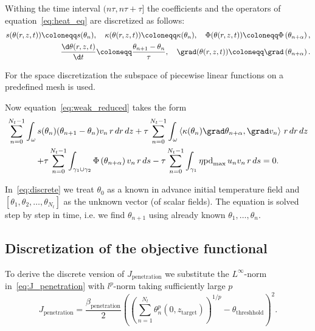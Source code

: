 Withing the time interval $(n\tau, n\tau+\tau]$ the coefficients and the operators of equation~\eqref{eq:heat_eq} are discretized as follows:
\begin{equation}
\begin{split}
	s(\theta(r,z,t)) \coloneqq s(\theta_n), \quad \kappa(\theta(r,z,t)) \coloneqq \kappa(\theta_n), \quad \Phi(\theta(r,z,t)) \coloneqq \Phi\left(\theta_{n+\alpha}\right), \\
	\frac{\d\theta(r,z,t)}{\d t} \coloneqq \frac{\theta_{n+1}-\theta_n}{\tau}, \quad
	\grad(\theta(r,z,t)) \coloneqq \grad\left(\theta_{n+\alpha}\right).
\end{split}
\end{equation}

For the space discretization the subspace of piecewise linear functions on a predefined mesh is used.

Now equation~\eqref{eq:weak_reduced} takes the form
\begin{multline} \label{eq:discrete}
	\sum_{n=0}^{N_t-1}\int_{\omega}
		s(\theta_n) (\theta_{n+1}-\theta_n) v_n\, r\, dr\, dz
	+ \tau
	\sum_{n=0}^{N_t-1}\int_{\omega}
		\left\langle \kappa(\theta_n) \grad \theta_{n+\alpha} , \grad v_n \right\rangle\, r\, dr \, dz \\
	+ \tau
	\sum_{n=0}^{N_t-1}\int_{\gamma_1 \cup \gamma_2}
		\Phi \left( \theta_{n+\alpha} \right)  v_n\, r\, ds
	- \tau
	\sum_{n=0}^{N_t-1}\int_{\gamma_1}
		\eta \text{pd}_{\max}\, u_n v_n\, r\, ds = 0.
\end{multline}

In~\eqref{eq:discrete} we treat $\theta_0$ as a known in advance initial temperature field and $[\theta_1, \theta_2, \ldots, \theta_{N_t}]$ as the unknown vector (of scalar fields). The equation is solved step by step in time, i.e. we find $\theta_{n+1}$ using already known $\theta_1, \ldots, \theta_n$.


\subsection{Discretization of the objective functional}

To derive the discrete version of $J_\text{penetration}$ we substitute the $L^{\infty}$-norm in~\eqref{eq:J_penetration} with $l^p$-norm taking sufficiently large $p$
\begin{equation}
	J_{\text{penetration}} = \frac{\beta_\text{penetration}}{2}
	\left(
		\left( \sum_{n=1}^{N_t} \theta_n^p (0, z_\text{target}) \right)^{1/p} - \theta_\text{threshhold}
	\right)^2.
\end{equation}

